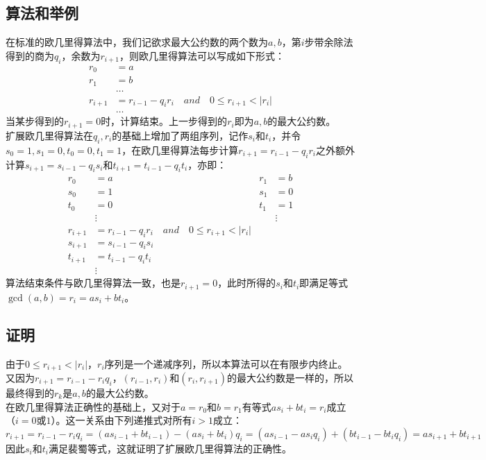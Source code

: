 \documentclass[UTF8]{ctexart}
\begin{document}
\subsection*{算法和举例}
在标准的欧几里得算法中，我们记欲求最大公约数的两个数为$a,b$，第$i$步带余除法得到的商为$q_i$，余数为$r_{i+1}$，则欧几里得算法可以写成如下形式：
\[
    \begin{aligned}
        r_0     & = a                                                       \\
        r_1     & = b                                                       \\
                & \ldots                                                    \\
        r_{i+1} & = r_{i-1} - q_ir_i \quad and \quad 0 \leq r_{i+1} < |r_i| \\
                & \ldots
    \end{aligned}
\]
当某步得到的$r_{i+1} = 0$时，计算结束。上一步得到的$r_i$即为$a,b$的最大公约数。\\
扩展欧几里得算法在$q_i,r_i$的基础上增加了两组序列，记作$s_i$和$t_i$，并令$s_0 = 1,s_1 = 0,t_0 = 0,t_1 = 1$，在欧几里得算法每步计算$r_{i+1} = r_{i-1} - q_i r_i$之外额外计算$s_{i+1} = s_{i-1} - q_is_i$和$t_{i+1} = t_{i-1} - q_it_i$，亦即：
\[
    \begin{aligned}
        r_0     & = a \qquad                                                & r_1 & = b    \\
        s_0     & = 1 \qquad                                                & s_1 & = 0    \\
        t_0     & = 0 \qquad                                                & t_1 & = 1    \\
                & \vdots \qquad                                             &     & \vdots \\
        r_{i+1} & = r_{i-1} - q_ir_i \quad and \quad 0 \leq r_{i+1} < |r_i|                \\
        s_{i+1} & = s_{i-1} - q_is_i                                                       \\
        t_{i+1} & = t_{i-1} - q_it_i                                                       \\
                & \vdots
    \end{aligned}
\]
算法结束条件与欧几里得算法一致，也是$r_{i+1} = 0$，此时所得的$s_i$和$t_i$即满足等式$\gcd(a,b) = r_i = as_i + bt_i$。
\subsection*{证明}
由于$0 \leq r_{i+1} < |r_i|$，$r_i$序列是一个递减序列，所以本算法可以在有限步内终止。又因为$r_{i+1} = r_{i-1} - r_iq_i$，$(r_{i-1},r_i)$和$(r_i,r_{i+1})$的最大公约数是一样的，所以最终得到的$r_k$是$a,b$的最大公约数。\\
在欧几里得算法正确性的基础上，又对于$a = r_0$和$b = r_1$有等式$as_i + bt_i = r_i$成立（$i = 0$或$1$）。这一关系由下列递推式对所有$i > 1$成立：
\[ r_{i+1} = r_{i-1} - r_iq_i = (as_{i-1} + bt_{i-1}) -(as_i + bt_i)q_i = (as_{i-1} - as_iq_i) + (bt_{i-1} - bt_iq_i) = as_{i+1} + bt_{i+1} \]
因此$s_i$和$t_i$满足裴蜀等式，这就证明了扩展欧几里得算法的正确性。
\vfill
\end{document}
